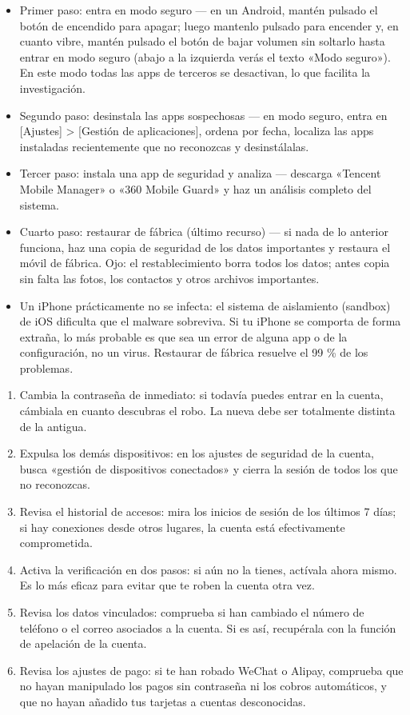 \begin{itemize}
  \item Primer paso: entra en modo seguro — en un Android, mantén pulsado el botón de encendido para apagar; luego mantenlo pulsado para encender y, en cuanto vibre, mantén pulsado el botón de bajar volumen sin soltarlo hasta entrar en modo seguro (abajo a la izquierda verás el texto «Modo seguro»). En este modo todas las apps de terceros se desactivan, lo que facilita la investigación.
  \item Segundo paso: desinstala las apps sospechosas — en modo seguro, entra en [Ajustes] > [Gestión de aplicaciones], ordena por fecha, localiza las apps instaladas recientemente que no reconozcas y desinstálalas.
  \item Tercer paso: instala una app de seguridad y analiza — descarga «Tencent Mobile Manager» o «360 Mobile Guard» y haz un análisis completo del sistema.
  \item Cuarto paso: restaurar de fábrica (último recurso) — si nada de lo anterior funciona, haz una copia de seguridad de los datos importantes y restaura el móvil de fábrica. Ojo: el restablecimiento borra todos los datos; antes copia sin falta las fotos, los contactos y otros archivos importantes.
  \item Un iPhone prácticamente no se infecta: el sistema de aislamiento (sandbox) de iOS dificulta que el malware sobreviva. Si tu iPhone se comporta de forma extraña, lo más probable es que sea un error de alguna app o de la configuración, no un virus. Restaurar de fábrica resuelve el 99 \% de los problemas.
\end{itemize}


\begin{enumerate}
  \item Cambia la contraseña de inmediato: si todavía puedes entrar en la cuenta, cámbiala en cuanto descubras el robo. La nueva debe ser totalmente distinta de la antigua.
  \item Expulsa los demás dispositivos: en los ajustes de seguridad de la cuenta, busca «gestión de dispositivos conectados» y cierra la sesión de todos los que no reconozcas.
  \item Revisa el historial de accesos: mira los inicios de sesión de los últimos 7 días; si hay conexiones desde otros lugares, la cuenta está efectivamente comprometida.
  \item Activa la verificación en dos pasos: si aún no la tienes, actívala ahora mismo. Es lo más eficaz para evitar que te roben la cuenta otra vez.
  \item Revisa los datos vinculados: comprueba si han cambiado el número de teléfono o el correo asociados a la cuenta. Si es así, recupérala con la función de apelación de la cuenta.
  \item Revisa los ajustes de pago: si te han robado WeChat o Alipay, comprueba que no hayan manipulado los pagos sin contraseña ni los cobros automáticos, y que no hayan añadido tus tarjetas a cuentas desconocidas.
\end{enumerate}

